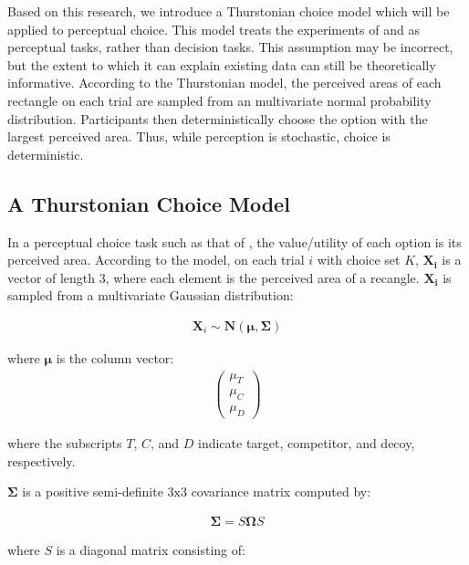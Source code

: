 Based on this research, we introduce a Thurstonian choice model which will be applied to perceptual choice. This model treats the experiments of \textcite{trueblood2013not} and \textcite{spektorWhenGoodLooks2018b} as perceptual tasks, rather than decision tasks. This assumption may be incorrect, but the extent to which it can explain existing data can still be theoretically informative. According to the Thurstonian model, the perceived areas of each rectangle on each trial are sampled from an multivariate normal probability distribution. Participants then deterministically choose the option with the largest perceived area. Thus, while perception is stochastic, choice is deterministic.

\subsection{A Thurstonian Choice Model}

In a perceptual choice task such as that of \textcite{spektorWhenGoodLooks2018b}, the value/utility of each option is its perceived area. According to the model, on each trial $i$ with choice set $K$, $\mathbf{X_i}$ is a vector of length $3$, where each element is the perceived area of a recangle. $\mathbf{X_i}$ is sampled from a multivariate Gaussian distribution:

\begin{align}
   \mathbf{X}_{i} \sim \mathrm{\bm{N}}(\boldsymbol{\mu}, \boldsymbol{\Sigma})
   \label{eqn:mvnorm}
\end{align}

where $\boldsymbol{\mu}$ is the column vector:
\begin{align}
   \begin{pmatrix}
      \mu_{T} \\
      \mu_{C} \\
      \mu_{D}
      \end{pmatrix}
   \label{eqn:mu}
\end{align}

where the subscripts $T$, $C$, and $D$ indicate target, competitor, and decoy, respectively.

$\boldsymbol{\Sigma}$ is a positive semi-definite $3 \text{x} 3$ covariance matrix computed by:

\begin{align}
   \boldsymbol{\Sigma}=S\boldsymbol{\Omega}S
   \label{eqn:Sigma}
\end{align}

where $S$ is a diagonal matrix consisting of: 

